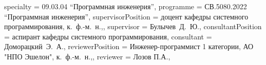 {    specialty          = {09.03.04 \enquote{Программная инженерия}},
    programme          = {СВ.5080.2022 \enquote{Программная инженерия}},
    supervisorPosition = {доцент кафедры системного программирования, к.~ф.-м.~н.,},
    supervisor         = {Булычев~Д.~Ю.},
    consultantPosition = {аспирант кафедры системного программирования},
    consultant         = {Доморацкий~Э.~А.},
    reviewerPosition   = {Инженер-программист 1 категории, АО "НПО Эшелон", к.~ф.-м.~н.,},
    reviewer           = {Лозов П.А.},
}

